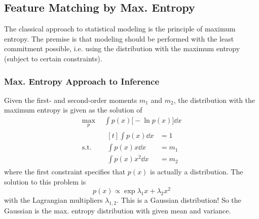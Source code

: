 		\subsection{Feature Matching by Max. Entropy}
			The classical approach to statistical modeling is the principle of maximum entropy. The premise is that modeling should be performed with the least commitment possible, i.e. using the distribution with the maximum entropy (subject to certain constraints).

			\subsubsection{Max. Entropy Approach to Inference}
				Given the first- and second-order moments \(m_1\) and \(m_2\), the distribution with the maximum entropy is given as the solution of
				\begin{equation*}
					\begin{aligned}
						\max_p \,& \int\! p(x) \big[\! -\!\ln p(x) \big] \dd{x} \\
						\mathrm{s.t.} \quad&
							\begin{aligned}[t]
								\int\! p(x) \dd{x} &= 1 \\
								\int\! p(x) x \dd{x} &= m_1 \\
								\int\! p(x) x^2 \dd{x} &= m_2
							\end{aligned}
					\end{aligned}
				\end{equation*}
				where the first constraint specifies that \(p(x)\) is actually a distribution. The solution to this problem is
				\begin{equation*}
					p(x) \propto \exp{ \lambda_1 x + \lambda_2 x^2 }
				\end{equation*}
				with the Lagrangian multipliers \(\lambda_{1, 2}\). This is a Gaussian distribution! So the Gaussian is the max. entropy distribution with given mean and variance.

